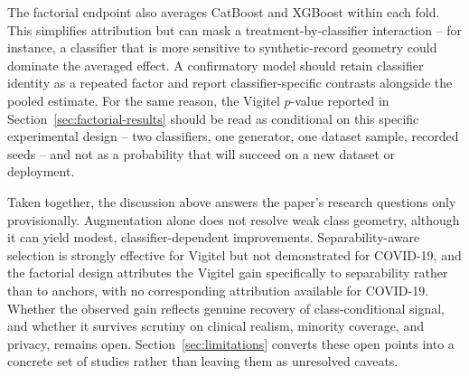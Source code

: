 The factorial endpoint also averages CatBoost and XGBoost within each fold. This simplifies attribution but can mask a treatment-by-classifier interaction -- for instance, a classifier that is more sensitive to synthetic-record geometry could dominate the averaged effect. A confirmatory model should retain classifier identity as a repeated factor and report classifier-specific contrasts alongside the pooled estimate. For the same reason, the Vigitel $p$-value reported in Section~\ref{sec:factorial-results} should be read as conditional on this specific experimental design -- two classifiers, one generator, one dataset sample, recorded seeds -- and not as a probability that \sepa{} will succeed on a new dataset or deployment.

Taken together, the discussion above answers the paper's research questions only provisionally. Augmentation alone does not resolve weak class geometry, although it can yield modest, classifier-dependent improvements. Separability-aware selection is strongly effective for Vigitel but not demonstrated for COVID-19, and the factorial design attributes the Vigitel gain specifically to separability rather than to anchors, with no corresponding attribution available for COVID-19. Whether the observed gain reflects genuine recovery of class-conditional signal, and whether it survives scrutiny on clinical realism, minority coverage, and privacy, remains open. Section~\ref{sec:limitations} converts these open points into a concrete set of studies rather than leaving them as unresolved caveats.
